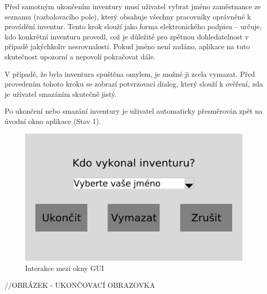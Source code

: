 
Před samotným ukončením inventury musí uživatel vybrat jméno zaměstnance ze seznamu (rozbalovacího pole), který obsahuje všechny pracovníky oprávněné k provádění inventur. Tento krok slouží jako forma elektronického podpisu – určuje, kdo konkrétní inventuru provedl, což je důležité pro zpětnou dohledatelnost v případě jakýchkoliv nesrovnalostí. Pokud jméno není zadáno, aplikace na tuto skutečnost upozorní a nepovolí pokračovat dále.

V případě, že byla inventura spuštěna omylem, je možné ji zcela vymazat. Před provedením tohoto kroku se zobrazí potvrzovací dialog, který slouží k ověření, zda je uživatel smazáním skutečně jistý.

Po ukončení nebo smazání inventury je uživatel automaticky přesměrován zpět na úvodní okno aplikace (Stav 1).


\begin{figure}[H]
    \begin{center}
        \includegraphics[scale=0.4]{obrazky/GUI Konec inventury.png}
    \end{center}
    \caption{Interakce mezi okny GUI}
    \label{Interakce mezi okny GUI}
\end{figure}
//OBRÁZEK - UKONČOVACÍ OBRAZOVKA

